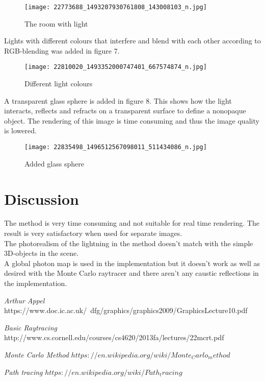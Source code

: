 \documentclass[a4paper,12pt]{IEEEtran}
\begin{document}
\begin{figure}[h!]
\texttt{[image: 22773688\_1493207930761808\_143008103\_n.jpg]}
\caption{The room with light}
\end{figure}

Lights with different colours that interfere and blend with each other according to RGB-blending was added in figure 7.
\begin{figure}[h!]
\texttt{[image: 22810020\_1493352000747401\_667574874\_n.jpg]}
\caption{Different light colours}
\end{figure}

A transparent glass sphere is added in figure 8. This shows how the light interacts, reflects and refracts on a transparent surface to define a nonopaque object. The rendering of this image is time consuming and thus the image quality is lowered. 
\begin{figure}[h!]
\texttt{[image: 22835498\_1496512567098011\_511434086\_n.jpg]}
\caption{Added glass sphere}
\end{figure}

\section{Discussion}
The method is very time consuming and not suitable for real time rendering. The result is very satisfactory when used for separate images. \\
The photorealism of the lightning in the method doesn't match with the simple 3D-objects in the scene.
\\
A global photon map is used in the implementation but it doesn't work as well as desired with the Monte Carlo raytracer and there aren't any caustic reflections in the implementation.
\begin{thebibliography}{00}
\emph{Arthur Appel}\newline
https://www.doc.ic.ac.uk/~dfg/graphics/graphics2009/GraphicsLecture10.pdf

\emph{Basic Raytracing}\newline
http://www.cs.cornell.edu/courses/cs4620/2013fa/lectures/22mcrt.pdf

\emph{Monte Carlo Method}\newline
$https://en.wikipedia.org/wiki/Monte_Carlo_method$

\emph{Path tracing}\newline
$https://en.wikipedia.org/wiki/Path_tracing$

\end{thebibliography}
\end{document}
